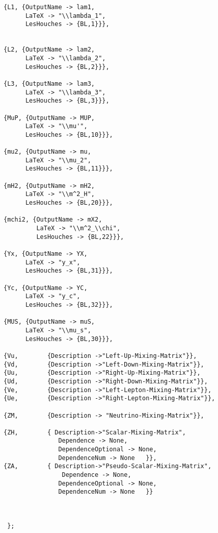 \begin{lstlisting}
{L1, {OutputName -> lam1,
      LaTeX -> "\\lambda_1",
      LesHouches -> {BL,1}}},


{L2, {OutputName -> lam2,
      LaTeX -> "\\lambda_2",
      LesHouches -> {BL,2}}},

{L3, {OutputName -> lam3,
      LaTeX -> "\\lambda_3",
      LesHouches -> {BL,3}}},

{MuP, {OutputName -> MUP,
      LaTeX -> "\\mu'",
      LesHouches -> {BL,10}}},

{mu2, {OutputName -> mu,
      LaTeX -> "\\mu_2",
      LesHouches -> {BL,11}}},

{mH2, {OutputName -> mH2,
      LaTeX -> "\\m^2_H",
      LesHouches -> {BL,20}}},

{mchi2, {OutputName -> mX2,
         LaTeX -> "\\m^2_\\chi",
         LesHouches -> {BL,22}}},
      
{Yx, {OutputName -> YX,
      LaTeX -> "y_x",
      LesHouches -> {BL,31}}},
      
{Yc, {OutputName -> YC,
      LaTeX -> "y_c",
      LesHouches -> {BL,32}}},

{MUS, {OutputName -> muS,
      LaTeX -> "\\mu_s",
      LesHouches -> {BL,30}}},
      
{Vu,        {Description ->"Left-Up-Mixing-Matrix"}},
{Vd,        {Description ->"Left-Down-Mixing-Matrix"}},
{Uu,        {Description ->"Right-Up-Mixing-Matrix"}},
{Ud,        {Description ->"Right-Down-Mixing-Matrix"}}, 
{Ve,        {Description ->"Left-Lepton-Mixing-Matrix"}},
{Ue,        {Description ->"Right-Lepton-Mixing-Matrix"}},

{ZM,	    {Description -> "Neutrino-Mixing-Matrix"}},

{ZH,        { Description->"Scalar-Mixing-Matrix", 
               Dependence -> None,
               DependenceOptional -> None,
               DependenceNum -> None   }},
{ZA,        { Description->"Pseudo-Scalar-Mixing-Matrix", 
                Dependence -> None,
               DependenceOptional -> None,
               DependenceNum -> None   }}



 }; 

\end{lstlisting}

